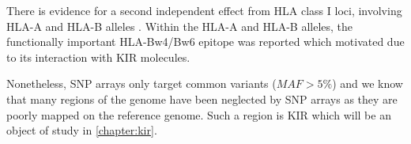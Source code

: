 
There is evidence for a second independent effect from HLA class I loci,
involving HLA-A and HLA-B alleles \citep{Todd:2010bl}.
Within the HLA-A and HLA-B alleles,
the functionally important HLA-Bw4/Bw6 epitope \citep{Nejentsev:2007dv} was reported which motivated  due to its interaction with
\glsdesc{KIR} molecules.

Nonetheless, SNP arrays only target common variants ($MAF > 5\%$) and
we know that many regions of the genome have been neglected by SNP arrays as they are poorly mapped on the reference genome.
Such a region is KIR which will be an object of study in \cref{chapter:kir}.







